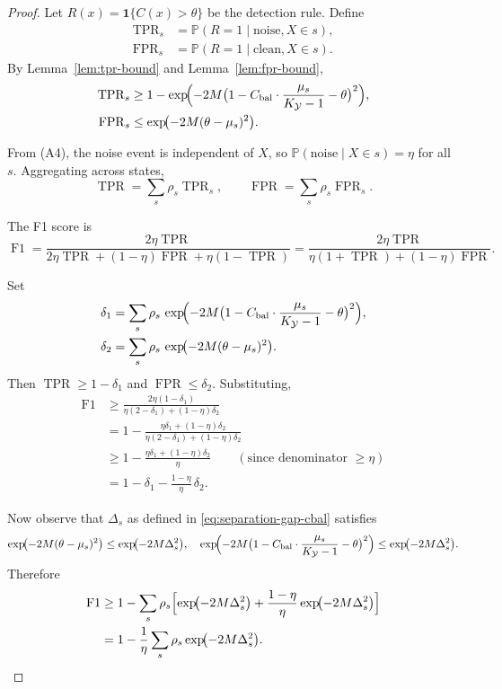 \begin{proof}
Let $R(x) = \mathbf{1}\{C(x) > \theta\}$ be the detection rule. Define
\begin{align*}
\operatorname{TPR}_s &=
\mathbb{P}(R = 1 \mid \text{noise}, X \in s), \\
\operatorname{FPR}_s &=
\mathbb{P}(R = 1 \mid \text{clean}, X \in s).
\end{align*}
By Lemma~\ref{lem:tpr-bound} and Lemma~\ref{lem:fpr-bound},
\begin{align*}
\operatorname{TPR}_s &\geq 1 -
\exp\!\Bigl(-2M\bigl(1 - C_{\text{bal}}\cdot\frac{\mu_s}{K_{\mathcal{Y}}-1}
- \theta\bigr)^2\Bigr), \\
\operatorname{FPR}_s &\leq
\exp\!\bigl(-2M(\theta - \mu_s)^2\bigr).
\end{align*}

From (A4), the noise event is independent of $X$, so
$\mathbb{P}(\text{noise} \mid X \in s) = \eta$ for all $s$. Aggregating across
states,
\[
\operatorname{TPR} = \sum_s \rho_s \operatorname{TPR}_s,\qquad
\operatorname{FPR} = \sum_s \rho_s \operatorname{FPR}_s.
\]

The F1 score is
\[
\operatorname{F1}
= \frac{2\eta\operatorname{TPR}}{2\eta\operatorname{TPR}
   + (1-\eta)\operatorname{FPR} + \eta(1-\operatorname{TPR})}
= \frac{2\eta\operatorname{TPR}}{\eta(1+\operatorname{TPR})
   + (1-\eta)\operatorname{FPR}}.
\]

Set
\begin{align*}
\delta_1 &= \sum_{s} \rho_s \,
\exp\!\Bigl(-2M\bigl(1 - C_{\text{bal}}\cdot\frac{\mu_s}{K_{\mathcal{Y}}-1}
- \theta\bigr)^2\Bigr), \\
\delta_2 &= \sum_{s} \rho_s \,
\exp\!\bigl(-2M(\theta - \mu_s)^2\bigr).
\end{align*}
Then $\operatorname{TPR} \geq 1 - \delta_1$ and
$\operatorname{FPR} \leq \delta_2$. Substituting,
\begin{align*}
\operatorname{F1}
&\geq \frac{2\eta(1-\delta_1)}{\eta(2-\delta_1) + (1-\eta)\delta_2} \\
&= 1 - \frac{\eta\delta_1 + (1-\eta)\delta_2}
         {\eta(2-\delta_1) + (1-\eta)\delta_2} \\
&\geq 1 - \frac{\eta\delta_1 + (1-\eta)\delta_2}{\eta}
\qquad(\text{since denominator }\geq \eta) \\
&= 1 - \delta_1 - \frac{1-\eta}{\eta}\,\delta_2 .
\end{align*}

Now observe that $\Delta_s$ as defined in
\eqref{eq:separation-gap-cbal} satisfies
\[
\exp\!\bigl(-2M(\theta - \mu_s)^2\bigr) \leq \exp\!\bigl(-2M\Delta_s^2\bigr),
\quad
\exp\!\Bigl(-2M\bigl(1 - C_{\text{bal}}\cdot\frac{\mu_s}{K_{\mathcal{Y}}-1}
- \theta\bigr)^2\Bigr) \leq \exp\!\bigl(-2M\Delta_s^2\bigr).
\]
Therefore
\begin{align*}
\operatorname{F1}
&\geq 1 - \sum_s \rho_s\Bigl[
   \exp\!\bigl(-2M\Delta_s^2\bigr)
   + \frac{1-\eta}{\eta}\exp\!\bigl(-2M\Delta_s^2\bigr)
\Bigr] \\
&= 1 - \frac{1}{\eta}\sum_s \rho_s\exp\!\bigl(-2M\Delta_s^2\bigr).
\qedhere
\end{align*}
\end{proof}

